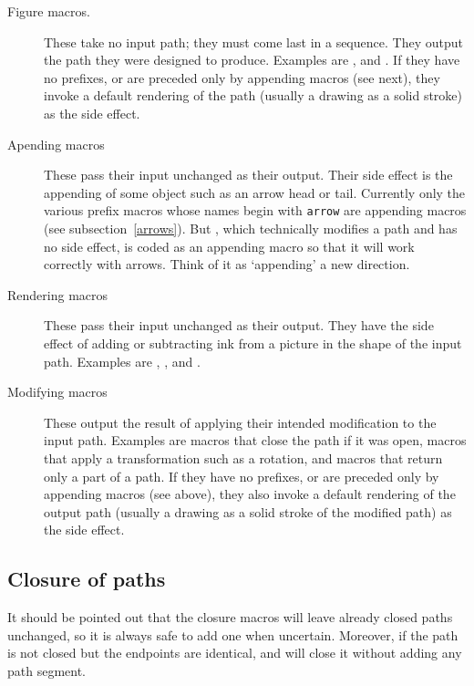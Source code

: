 \documentclass[letterpaper]{article}
\begin{document}
\begin{description}

\item[Figure macros.] These take no input path; they
    must come last in a sequence. They output the path they were
    designed to produce. Examples are ,  and
    . If they have no prefixes, or are preceded only by
    appending macros (see next), they invoke a default rendering of the
    path (usually a drawing as a solid stroke) as the side effect.

\item[Apending macros] These pass their input
    unchanged as their output. Their side effect is the appending of
    some object such as an arrow head or tail. Currently only the
    various prefix macros whose names begin with \texttt{arrow} are
    appending macros (see subsection~\ref{arrows}). But ,
    which technically modifies a path and has no side effect, is coded
    as an appending macro so that it will work correctly with arrows.
    Think of it as `appending' a new direction.

\item[Rendering macros] These pass their
    input unchanged as their output. They have the side effect of adding
    or subtracting ink from a picture in the shape of the input path.
    Examples are , ,  and .

\item[Modifying macros] These output the result of
    applying their intended modification to the input path. Examples are
    macros that close the path if it was open, macros that apply a
    transformation such as a rotation, and macros that return only a
    part of a path. If they have no prefixes, or are preceded only by
    appending macros (see above), they also invoke a default rendering
    of the output path (usually a drawing as a solid stroke of the
    modified path) as the side effect.

\end{description}

\subsection{Closure of paths}\label{closure}

It should be pointed out that the closure macros will leave already
closed paths unchanged, so it is always safe to add one when uncertain.
Moreover, if the path is not closed but the endpoints are identical,
 and  will close it without adding any path segment.
\end{document}
